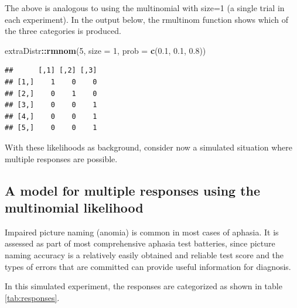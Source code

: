 \documentclass[12pt,]{krantz}
\newenvironment{Shaded}{\begin{snugshade}}{\end{snugshade}}
\newcommand{\DataTypeTok}[1]{\textcolor[rgb]{0.13,0.29,0.53}{#1}}
\newcommand{\DecValTok}[1]{\textcolor[rgb]{0.00,0.00,0.81}{#1}}
\newcommand{\FloatTok}[1]{\textcolor[rgb]{0.00,0.00,0.81}{#1}}
\newcommand{\KeywordTok}[1]{\textcolor[rgb]{0.13,0.29,0.53}{\textbf{#1}}}
\newcommand{\NormalTok}[1]{#1}
\newcommand{\OperatorTok}[1]{\textcolor[rgb]{0.81,0.36,0.00}{\textbf{#1}}}
\theoremstyle{definition}
\theoremstyle{definition}
\theoremstyle{definition}
\theoremstyle{remark}
\begin{document}
The above is analogous to using the multinomial with size=1 (a single trial in each experiment). In the output below, the rmultinom function shows which of the three categories is produced.

\begin{Shaded}
\begin{Highlighting}[]
\NormalTok{extraDistr}\OperatorTok{::}\KeywordTok{rmnom}\NormalTok{(}\DecValTok{5}\NormalTok{, }\DataTypeTok{size =} \DecValTok{1}\NormalTok{, }\DataTypeTok{prob =} \KeywordTok{c}\NormalTok{(}\FloatTok{0.1}\NormalTok{, }\FloatTok{0.1}\NormalTok{, }\FloatTok{0.8}\NormalTok{))}
\end{Highlighting}
\end{Shaded}

\begin{verbatim}
##      [,1] [,2] [,3]
## [1,]    1    0    0
## [2,]    0    1    0
## [3,]    0    0    1
## [4,]    0    0    1
## [5,]    0    0    1
\end{verbatim}

With these likelihoods as background, consider now a simulated situation where multiple responses are possible.

\hypertarget{sec:mult}{%
\subsection{A model for multiple responses using the multinomial likelihood}\label{sec:mult}}

Impaired picture naming (anomia) is common in most cases of aphasia. It is assessed as part of most comprehensive aphasia test batteries, since picture naming accuracy is a relatively easily obtained and reliable test score and the types of errors that are committed can provide useful information for diagnosis.

In this simulated experiment, the responses are categorized as shown in table \ref{tab:responses}.
\end{document}
